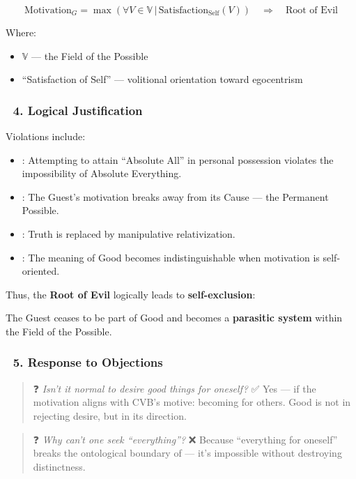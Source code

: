 \documentclass[12pt]{article}
\begin{document}
\[
\text{Motivation}_G = \max\!\left(\forall V \in \mathbb{V} \,\big|\,
\text{Satisfaction}_{\text{Self}}(V)\right)
\quad \Rightarrow \quad \text{Root of Evil}
\]

Where:

\begin{itemize}
\item $\mathbb{V}$ — the Field of the Possible
\item ``Satisfaction of Self'' — volitional orientation toward egocentrism
\end{itemize}

\subsubsection*{🔹 4. Logical Justification}

Violations include:

\begin{itemize}
\item \text{[2]}: Attempting to attain ``Absolute All'' in personal possession violates the impossibility of Absolute Everything.
\item \text{[6]}: The Guest’s motivation breaks away from its Cause — the Permanent Possible.
\item \text{[11.2]}: Truth is replaced by manipulative relativization.
\item \text{[24.5]}: The meaning of Good becomes indistinguishable when motivation is self-oriented.
\end{itemize}

Thus, the \textbf{Root of Evil} logically leads to \textbf{self-exclusion}:

The Guest ceases to be part of Good and becomes a \textbf{parasitic system} within the Field of the Possible.

\subsubsection*{🔹 5. Response to Objections}

\begin{quote}
❓ \textit{Isn’t it normal to desire good things for oneself?}  
✅ Yes — if the motivation aligns with CVB’s motive: becoming for others. Good is not in rejecting desire, but in its direction.
\end{quote}

\begin{quote}
❓ \textit{Why can’t one seek ``everything''?}  
❌ Because ``everything for oneself'' breaks the ontological boundary of \text{[2]} — it's impossible without destroying distinctness.
\end{quote}
\end{document}
